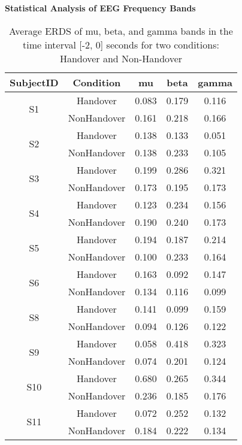 \documentclass[10pt]{article}
\begin{document}
\subsection*{}
\textbf{Statistical Analysis of EEG Frequency Bands}
\begin{table}[h]
    \centering
    \caption{Average ERDS of mu, beta, and gamma bands in the time interval [-2, 0] seconds for two conditions: Handover and Non-Handover}
    \begin{tabular}{ccccc}
    \toprule
        SubjectID & Condition & mu & beta & gamma \\
        \midrule
        \multirow{2}{*}{S1} & Handover & 0.083 & 0.179 & 0.116 \\& NonHandover &  0.161 & 0.218 & 0.166 \\
        \midrule
        \multirow{2}{*}{S2} & Handover & 0.138 & 0.133 & 0.051 \\& NonHandover & 0.138 & 0.233 & 0.105 \\
        \midrule
        \multirow{2}{*}{S3} & Handover & 0.199 & 0.286 & 0.321 \\& NonHandover & 0.173 & 0.195 & 0.173 \\
        \midrule
        \multirow{2}{*}{S4} & Handover & 0.123 & 0.234 & 0.156 \\& NonHandover & 0.190 & 0.240 & 0.173 \\
        \midrule
        \multirow{2}{*}{S5} & Handover & 0.194 & 0.187 & 0.214 \\& NonHandover & 0.100 & 0.233 & 0.164 \\
        \midrule
        \multirow{2}{*}{S6} & Handover & 0.163 & 0.092 & 0.147 \\& NonHandover & 0.134 & 0.116 & 0.099 \\
        \midrule
        \multirow{2}{*}{S8} & Handover & 0.141 & 0.099 & 0.159 \\& NonHandover & 0.094 & 0.126 & 0.122 \\
        \midrule
        \multirow{2}{*}{S9} & Handover & 0.058 & 0.418 & 0.323 \\& NonHandover & 0.074 & 0.201 & 0.124 \\
        \midrule
        \multirow{2}{*}{S10} & Handover & 0.680 & 0.265 & 0.344 \\& NonHandover & 0.236 & 0.185 & 0.176 \\
        \midrule
        \multirow{2}{*}{S11} & Handover & 0.072 & 0.252 & 0.132 \\& NonHandover & 0.184 & 0.222 & 0.134 \\

\end{tabular}
\end{table}
\end{document}

